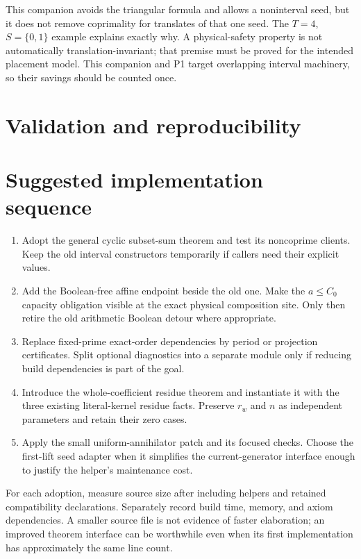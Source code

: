 \documentclass[11pt,letterpaper]{article}
\begin{document}
This companion avoids the triangular formula and allows a noninterval
seed, but it does not remove coprimality for translates of that one seed.
The $T=4$, $S=\{0,1\}$ example explains exactly why. A physical-safety
property is not automatically translation-invariant; that premise must be
proved for the intended placement model. This companion and P1 target
overlapping interval machinery, so their savings should be counted once.

\section{Validation and reproducibility}
\label{sec:validation}



\section{Suggested implementation sequence}

\begin{enumerate}
\item Adopt the general cyclic subset-sum theorem and test its noncoprime
clients. Keep the old interval constructors temporarily if callers need
their explicit values.
\item Add the Boolean-free affine endpoint beside the old one. Make the
$a\le C_0$ capacity obligation visible at the exact physical composition
site. Only then retire the old arithmetic Boolean detour where appropriate.
\item Replace fixed-prime exact-order dependencies by period or projection
certificates. Split optional diagnostics into a separate module only if
reducing build dependencies is part of the goal.
\item Introduce the whole-coefficient residue theorem and instantiate it
with the three existing literal-kernel residue facts. Preserve $r_w$ and
$n$ as independent parameters and retain their zero cases.
\item Apply the small uniform-annihilator patch and its focused checks.
Choose the first-lift seed adapter when it simplifies the current-generator
interface enough to justify the helper's maintenance cost.
\end{enumerate}

For each adoption, measure source size after including helpers and retained
compatibility declarations. Separately record build time, memory, and axiom
dependencies. A smaller source file is not evidence of faster elaboration;
an improved theorem interface can be worthwhile even when its first
implementation has approximately the same line count.
\end{document}
